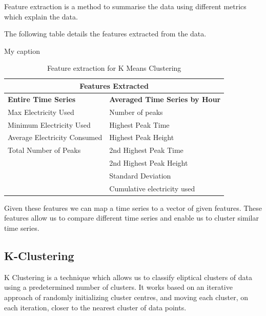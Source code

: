 \documentclass[12pt]{article}\usepackage[]{graphicx}\usepackage[]{color}
\begin{document}
Feature extraction is a method to summarise the data using different metrics which explain the data.

The following table details the features extracted from the data. 
\begin{table}[]
\centering
\caption{My caption}
\label{my-label}
\begin{tabular}{ll}
\multicolumn{2}{c}{\textbf{Features Extracted}}                                                                 \\ \hline
\multicolumn{1}{|l|}{\textbf{Entire Time Series}}  & \multicolumn{1}{l|}{\textbf{Averaged Time Series by Hour}} \\ \hline
\multicolumn{1}{|l|}{Max Electricity Used}         & \multicolumn{1}{l|}{Number of peaks}                       \\ \hline
\multicolumn{1}{|l|}{Minimum Electricity Used}     & \multicolumn{1}{l|}{Highest Peak Time}                     \\ \hline
\multicolumn{1}{|l|}{Average Electricity Consumed} & \multicolumn{1}{l|}{Highest Peak Height}                   \\ \hline
\multicolumn{1}{|l|}{Total Number of Peaks}        & \multicolumn{1}{l|}{2nd Highest Peak Time}                 \\ \hline
\multicolumn{1}{|l|}{}                             & \multicolumn{1}{l|}{2nd Highest Peak Height}               \\ \hline
\multicolumn{1}{|l|}{}                             & \multicolumn{1}{l|}{Standard Deviation}                    \\ \hline
\multicolumn{1}{|l|}{}                             & \multicolumn{1}{l|}{Cumulative electricity used}           \\ \hline
\end{tabular}
\caption{Feature extraction for K Means Clustering}
\end{table}


Given these features we can map a time series to a vector of given features. These features allow us to compare different time series and enable us to cluster similar time series. 

\subsection{K-Clustering}

K Clustering is a technique which allows us to classify eliptical clusters of data using a predetermined number of clusters. It works based on an iterative approach of randomly initializing cluster centres, and moving each cluster, on each iteration, closer to the nearest cluster of data points.\\
\end{document}
